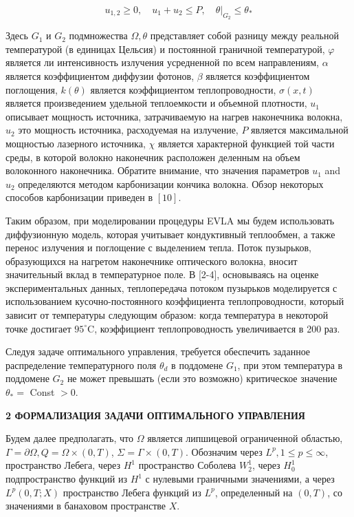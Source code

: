 \documentclass[10pt]{article}
\begin{document}
\[
u_{1,2} \geq 0, \quad u_{1}+u_{2} \leq P,\left.\quad \theta\right|_{G_{2}} \leq \theta_{*}
\]

Здесь $G_{1}$ и $G_{2}$ подмножества $\Omega, \theta$
представляет собой разницу между реальной температурой
(в единицах Цельсия) и постоянной граничной температурой,
$\varphi$ является ли интенсивность излучения усредненной по всем направлениям, $\alpha$
является коэффициентом диффузии фотонов, $\beta$ является коэффициентом поглощения,
$k(\theta)$ является коэффициентом теплопроводности, $\sigma(x, t)$
является произведением удельной теплоемкости и объемной плотности, $u_{1}$
описывает мощность источника, затрачиваемую на нагрев наконечника волокна, $u_{2}$
это мощность источника, расходуемая на излучение,
$P$ является максимальной мощностью лазерного источника, $\chi$
является характерной функцией той части среды, в которой волокно
наконечник расположен деленным на объем волоконного наконечника.
Обратите внимание, что значения параметров $u_{1}$ and $u_{2}$
определяются методом карбонизации кончика волокна.
Обзор некоторых способов карбонизации приведен в $[10]$.

Таким образом, при моделировании процедуры EVLA мы будем использовать диффузионную модель,
которая учитывает кондуктивный теплообмен, а также перенос излучения и поглощение с выделением тепла.
Поток пузырьков, образующихся на нагретом наконечнике оптического волокна, вносит значительный
вклад в температурное поле. В [2-4], основываясь на оценке экспериментальных данных,
теплопередача потоком пузырьков моделируется с использованием кусочно-постоянного
коэффициента теплопроводности, который зависит от температуры следующим образом:
когда температура в некоторой точке достигает $95 ^ {\circ} \mathrm{C}$,
коэффициент теплопроводность увеличивается в 200 раз.

Следуя задаче оптимального управления, требуется обеспечить заданное распределение
температурного поля $\theta_{d}$ в поддомене $G_{1}$,
при этом температура в поддомене $G_{2}$ не может превышать
(если это возможно) критическое значение $\theta_{*}=$ Const $>0$.



\textbf{2 ФОРМАЛИЗАЦИЯ ЗАДАЧИ ОПТИМАЛЬНОГО УПРАВЛЕНИЯ}


Будем далее предполагать, что $\Omega$ является липшицевой ограниченной областью,
$\Gamma=\partial \Omega, Q=\Omega \times(0, T)$, $\Sigma=\Gamma \times(0, T)$.
Обозначим через $L^{p}, 1 \leq p \leq \infty$, пространство Лебега,
через $H^{1}$ пространство Соболева $W_{2}^{1}$,
через $H_{ 0}^{1}$ подпространство функций из $H^{1}$ с нулевыми граничными значениями,
а через $L^{p}(0, T ; X)$ пространство Лебега функций из $L^{ p}$,
определенный на $(0, T)$, со значениями в банаховом пространстве $X$.
\end{document}
